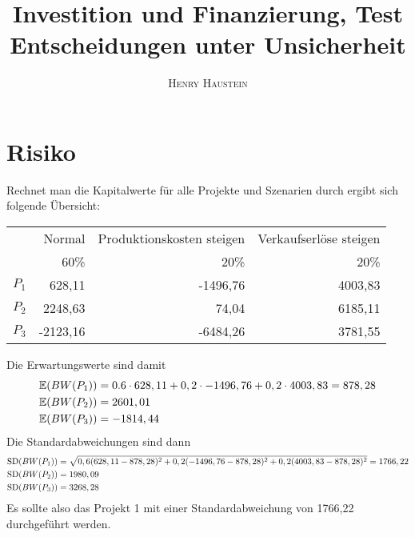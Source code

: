 \documentclass{article}
\title{\textbf{Investition und Finanzierung, Test Entscheidungen unter Unsicherheit}}
\author{\textsc{Henry Haustein}}
\date{}
\newcommand{\E}{\mathbb{E}}
\DeclareMathOperator{\SD}{SD}
\begin{document}
	\maketitle
	
	\section*{Risiko}
	Rechnet man die Kapitalwerte für alle Projekte und Szenarien durch ergibt sich folgende Übersicht:
	\begin{center}
		\begin{tabular}{l|r|r|r}
			& Normal & Produktionskosten steigen & Verkaufserlöse steigen \\
			& 60\% & 20\% & 20\% \\
			\hline
			$P_1$ & 628,11 & -1496,76 & 4003,83 \\
			\hline
			$P_2$ & 2248,63 & 74,04 & 6185,11 \\
			\hline
			$P_3$ & -2123,16 & -6484,26 & 3781,55
		\end{tabular}
	\end{center}
	Die Erwartungswerte sind damit
	\begin{align}
		\E(BW(P_1)) &= 0.6\cdot 628,11 + 0,2\cdot -1496,76 + 0,2\cdot 4003,83 = 878,28 \notag \\
		\E(BW(P_2)) &= 2601,01 \notag \\
		\E(BW(P_3)) &= -1814,44 \notag
	\end{align}
	Die Standardabweichungen sind dann
	\begin{align}
		\SD(BW(P_1)) &= \sqrt{0,6(628,11-878,28)^2 + 0,2(-1496,76 - 878,28)^2 + 0,2(4003,83 - 878,28)^2} = 1766,22 \notag \\
		\SD(BW(P_2)) &= 1980,09 \notag \\
		\SD(BW(P_3)) &= 3268,28 \notag
	\end{align}
	Es sollte also das Projekt 1 mit einer Standardabweichung von 1766,22 durchgeführt werden.
	
\end{document}
